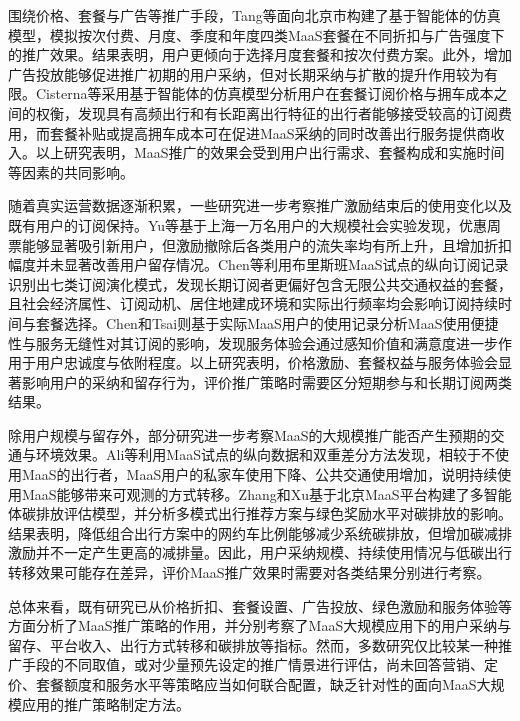 围绕价格、套餐与广告等推广手段，Tang等\citep{tangExploringPotentialAdoption2025}面向北京市构建了基于智能体的仿真模型，模拟按次付费、月度、季度和年度四类MaaS套餐在不同折扣与广告强度下的推广效果。结果表明，用户更倾向于选择月度套餐和按次付费方案。此外，增加广告投放能够促进推广初期的用户采纳，但对长期采纳与扩散的提升作用较为有限。Cisterna等\citep{cisternaAssessingWillingnessPay2024}采用基于智能体的仿真模型分析用户在套餐订阅价格与拥车成本之间的权衡，发现具有高频出行和有长距离出行特征的出行者能够接受较高的订阅费用，而套餐补贴或提高拥车成本可在促进MaaS采纳的同时改善出行服务提供商收入。以上研究表明，MaaS推广的效果会受到用户出行需求、套餐构成和实施时间等因素的共同影响。

随着真实运营数据逐渐积累，一些研究进一步考察推广激励结束后的使用变化以及既有用户的订阅保持。Yu等\citep{yuTransitioningIncentivebasedUser2025}基于上海一万名用户的大规模社会实验发现，优惠周票能够显著吸引新用户，但激励撤除后各类用户的流失率均有所上升，且增加折扣幅度并未显著改善用户留存情况。Chen等\citep{chenInvestigatingCustomersTypical2025}利用布里斯班MaaS试点的纵向订阅记录识别出七类订阅演化模式，发现长期订阅者更偏好包含无限公共交通权益的套餐，且社会经济属性、订阅动机、居住地建成环境和实际出行频率均会影响订阅持续时间与套餐选择。Chen和Tsai\citep{chenDeeperLookEffects2026}则基于实际MaaS用户的使用记录分析MaaS使用便捷性与服务无缝性对其订阅的影响，发现服务体验会通过感知价值和满意度进一步作用于用户忠诚度与依附程度。以上研究表明，价格激励、套餐权益与服务体验会显著影响用户的采纳和留存行为，评价推广策略时需要区分短期参与和长期订阅两类结果。

除用户规模与留存外，部分研究进一步考察MaaS的大规模推广能否产生预期的交通与环境效果。Ali等\citep{aliMonitoringEvaluationTravel2025}利用MaaS试点的纵向数据和双重差分方法发现，相较于不使用MaaS的出行者，MaaS用户的私家车使用下降、公共交通使用增加，说明持续使用MaaS能够带来可观测的方式转移。Zhang和Xu\citep{zhangPromotingLowCarbon2025}基于北京MaaS平台构建了多智能体碳排放评估模型，并分析多模式出行推荐方案与绿色奖励水平对碳排放的影响。结果表明，降低组合出行方案中的网约车比例能够减少系统碳排放，但增加碳减排激励并不一定产生更高的减排量。因此，用户采纳规模、持续使用情况与低碳出行转移效果可能存在差异，评价MaaS推广效果时需要对各类结果分别进行考察。

总体来看，既有研究已从价格折扣、套餐设置、广告投放、绿色激励和服务体验等方面分析了MaaS推广策略的作用，并分别考察了MaaS大规模应用下的用户采纳与留存、平台收入、出行方式转移和碳排放等指标。然而，多数研究仅比较某一种推广手段的不同取值，或对少量预先设定的推广情景进行评估，尚未回答营销、定价、套餐额度和服务水平等策略应当如何联合配置，缺乏针对性的面向MaaS大规模应用的推广策略制定方法。

